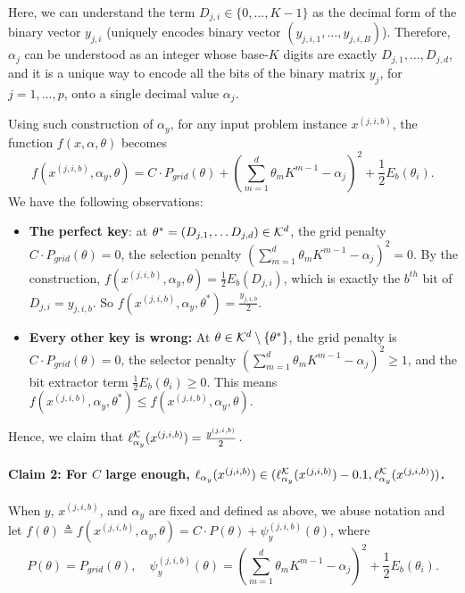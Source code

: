         Here, we can understand the term $D_{j, i} \in \{0, \dots, K - 1\}$ as the decimal form of the binary vector $y_{j, i}$ (uniquely encodes binary vector $(y_{j, i, 1}, \dots, y_{j, i, B})$). Therefore, $\alpha_j$ can be understood as an integer whose base-$K$ digits are exactly $D_{j, 1}, \dots, D_{j, d}$, and it is a unique way to encode all the bits of the binary matrix $y_j$, for $j = 1, \dots, p$, onto a single decimal value $\alpha_j$.

    Using such construction of $\alpha_y$, for any input problem instance $x^{(j, i, b)}$, the function $f(x, \alpha, \theta)$ becomes
    \[
        f(x^{(j, i, b)}, \alpha_y, \theta) = C \cdot P_{grid}(\theta) + \left(\sum_{m=1}^d \theta_m K^{m - 1} - \alpha_j\right)^2 + \frac{1}{2}E_b(\theta_i).
    \]
    We have the following observations:
    \begin{itemize}
        \item \textbf{The perfect key}: at $\theta^* = (D_{j, 1}, \dots D_{j, d}) \in \mathcal{K}^d$, the grid penalty $C \cdot P_{grid}(\theta) = 0$, the selection penalty $\left(\sum_{m=1}^d \theta_m K^{m - 1} - \alpha_j\right)^2 = 0$. By the construction, $f(x^{(j, i, b)}, \alpha_y, \theta) = \frac{1}{2}E_b(D_{j, i})$, which is exactly the $b^{th}$ bit of $D_{j, i} = y_{j, i, b}$. So $f(x^{(j, i, b)}, \alpha_y, \theta^*) = \frac{y_{j, i, b}}{2}$.
        \item \textbf{Every other key is wrong:} At $\theta \in \mathcal{K}^d \setminus \{\theta^*\}$, the grid penalty is $C \cdot P_{grid}(\theta) = 0$, the selector penalty $\left(\sum_{m=1}^d \theta_m K^{m - 1} - \alpha_j\right)^2 \geq 1$, and the bit extractor term $\frac{1}{2}E_b(\theta_i) \geq 0$. This means $f(x^{(j, i, b)}, \alpha_y, \theta^*) \leq f(x^{(j, i, b)}, \alpha_y, \theta)$.
    \end{itemize} 
    Hence, we claim that $\ell^{\mathcal{K}}_{\alpha_y}(x^{(j, i, b)}) = \frac{y^{(j, i, b)}}{2}$.

    \paragraph{Claim 2: For $C$ large enough, $\ell_{\alpha_y}(x^{(j, i, b)}) \in (\ell^{\mathcal{K}}_{\alpha_y}(x^{(j, i, b)}) - 0.1, \ell^{\mathcal{K}}_{\alpha_y}(x^{(j, i, b)}))$.} When $y$, $x^{(j, i, b)}$, and $\alpha_y$ are fixed and defined as above, we abuse notation and let $f(\theta) \triangleq f(x^{(j, i, b)}, \alpha_y, \theta) = C\cdot P(\theta) + \psi^{(j, i, b)}_{y}(\theta)$, where
    \[
        P(\theta) = P_{grid}(\theta), \quad \psi^{(j, i, b)}_{y}(\theta) = \left(\sum_{m=1}^d \theta_m K^{m - 1} - \alpha_j\right)^2 + \frac{1}{2}E_b(\theta_i).
    \]
    
